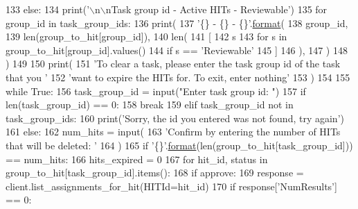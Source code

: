 \begin{DoxyCode}
133     \textcolor{keywordflow}{else}:
134         print(\textcolor{stringliteral}{'\(\backslash\)n\(\backslash\)nTask group id - Active HITs - Reviewable'})
135         \textcolor{keywordflow}{for} group\_id \textcolor{keywordflow}{in} task\_group\_ids:
136             print(
137                 \textcolor{stringliteral}{'\{\} - \{\} - \{\}'}.\hyperlink{namespaceparlai_1_1chat__service_1_1services_1_1messenger_1_1shared__utils_a32e2e2022b824fbaf80c747160b52a76}{format}(
138                     group\_id,
139                     len(group\_to\_hit[group\_id]),
140                     len(
141                         [
142                             s
143                             \textcolor{keywordflow}{for} s \textcolor{keywordflow}{in} group\_to\_hit[group\_id].values()
144                             \textcolor{keywordflow}{if} s == \textcolor{stringliteral}{'Reviewable'}
145                         ]
146                     ),
147                 )
148             )
149 
150     print(
151         \textcolor{stringliteral}{'To clear a task, please enter the task group id of the task that you '}
152         \textcolor{stringliteral}{'want to expire the HITs for. To exit, enter nothing'}
153     )
154 
155     \textcolor{keywordflow}{while} \textcolor{keyword}{True}:
156         task\_group\_id = input(\textcolor{stringliteral}{"Enter task group id: "})
157         \textcolor{keywordflow}{if} len(task\_group\_id) == 0:
158             \textcolor{keywordflow}{break}
159         \textcolor{keywordflow}{elif} task\_group\_id \textcolor{keywordflow}{not} \textcolor{keywordflow}{in} task\_group\_ids:
160             print(\textcolor{stringliteral}{'Sorry, the id you entered was not found, try again'})
161         \textcolor{keywordflow}{else}:
162             num\_hits = input(
163                 \textcolor{stringliteral}{'Confirm by entering the number of HITs that will be deleted: '}
164             )
165             \textcolor{keywordflow}{if} \textcolor{stringliteral}{'\{\}'}.\hyperlink{namespaceparlai_1_1chat__service_1_1services_1_1messenger_1_1shared__utils_a32e2e2022b824fbaf80c747160b52a76}{format}(len(group\_to\_hit[task\_group\_id])) == num\_hits:
166                 hits\_expired = 0
167                 \textcolor{keywordflow}{for} hit\_id, status \textcolor{keywordflow}{in} group\_to\_hit[task\_group\_id].items():
168                     \textcolor{keywordflow}{if} approve:
169                         response = client.list\_assignments\_for\_hit(HITId=hit\_id)
170                         \textcolor{keywordflow}{if} response[\textcolor{stringliteral}{'NumResults'}] == 0:

\end{DoxyCode}
